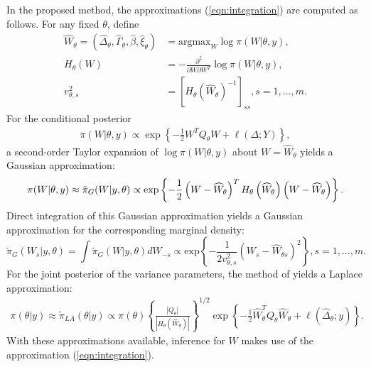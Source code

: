 \documentclass[ba]{imsart}
\begin{document}
In the proposed method, the approximations (\ref{eqn:integration}) are computed as follows. For any fixed $\theta$, define
\begin{equation}\begin{aligned}\label{eqn:modeandhessian}
\widehat{W}_{\theta} = \left( \widehat{\Delta}_{\theta},\widehat{\Gamma}_{\theta},\widehat{\beta},\widehat{\xi}_{\theta}\right) &= \text{argmax}_{W}\log\pi(W|\theta,y) , \\ 
H_{\theta}(W) &= -\frac{\partial^{2}}{\partial W \partial W^{T}}\log\pi(W|\theta,y) , \\
v_{\theta,s}^{2} &= \left[H_\theta \left(\widehat{W}_{\theta}\right) ^ {-1} \right]_{ss}, s = 1,\ldots,m .
\end{aligned}\end{equation}
For the conditional posterior
\begin{equation}\begin{aligned}\label{eqn:condpost}
\pi(W|\theta,y) \propto \exp\left\lbrace -\frac{1}{2}W^{T}Q_{\theta}W + \ell\left(\Delta;Y\right)\right\rbrace,
\end{aligned}\end{equation}
a second-order Taylor expansion of $\log\pi(W|\theta,y)$ about $W = \widehat{W}_{\theta}$ yields a Gaussian approximation:
\begin{equation}\label{eqn:gaussianapprox}
\pi(W|\theta,y) \approx \tilde{\pi}_{G}(W|y,\theta) \propto \text{exp}\left\{-\frac{1}{2} \left(W-\widehat{W}_{\theta} \right)^T H_\theta\left(\widehat{W}_{\theta}\right) \left(W-\widehat{W}_{\theta} \right) \right\}. \\
\end{equation}
Direct integration of this Gaussian approximation yields a Gaussian approximation for the corresponding marginal density:
\begin{equation}\label{eqb:marginalgaussianapprox}
\tilde{\pi}_{G}(W_{s}|y,\theta) = \int\tilde{\pi}_{G}(W|y,\theta)dW_{-s} \propto\text{exp}\left\{-\frac{1}{2v_{\theta,s}^{2}} \left(W_s-\widehat{W}_{\theta s} \right)^2 \right\}, s = 1,\ldots,m .
\end{equation}
For the joint posterior of the variance parameters, the method of \cite{tierney} yields a Laplace approximation:
\begin{equation}\begin{aligned}\label{eqn:laplace}
\pi(\theta|y) \approx \tilde{\pi}_{LA}(\theta|y) \propto \pi(\theta)\left\{\frac{\left|Q_{\theta}\right|}{\left|H_{\theta}\left(\widehat{W}_{\theta}\right)\right|}\right\}^{1/2}\exp\left\{ -\frac{1}{2}\widehat{W}_{\theta}^{T}Q_{\theta}\widehat{W}_{\theta} + \ell\left(\widehat{\Delta}_{\theta};y \right)\right\}.
\end{aligned}\end{equation}
With these approximations available, inference for $W$ makes use of the approximation (\ref{eqn:integration}).
\end{document}

